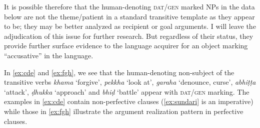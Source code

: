 \documentclass[output=paper,
modfonts
]{LSP/langsci}
\begin{document}
It is possible therefore that the human-denoting \textsc{dat/gen} marked NPs in the data below are not the theme/patient   in a standard transitive template as they appear to be; they may be  better analyzed as recipient or goal arguments. I will leave the adjudication of this issue for further research. But regardless of their status, they provide further surface evidence to the language acquirer for an object marking  ``accusative'' in the language.



In \cref{ex:cde} and \cref{ex:fgh}, we see that the human-denoting non-subject  of the transitive verbs \textit{khama} `forgive', \textit{pekkha} `look at', \textit{garaha} `denounce, curse', \textit{abhiṭṭa} `attack',   \textit{ḍhukka} `approach' and \textit{bhiḍ} `battle'  appear with \textsc{dat/gen} marking. The examples in \cref{ex:cde} contain non-perfective  clauses (\cref{ex:sundari} is an imperative) while those in \cref{ex:fgh} illustrate the argument realization pattern in perfective clauses.
\end{document}
